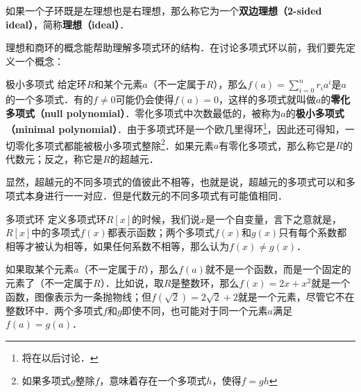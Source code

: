 如果一个子环既是左理想也是右理想，那么称它为一个\textbf{双边理想（2-sided ideal）}，简称\textbf{理想（ideal）}．

理想和商环的概念能帮助理解多项式环的结构．在讨论多项式环以前，我们要先定义一个概念：

\begin{definition}{极小多项式}
给定环$R$和某个元素$a$（不一定属于$R$），那么$f(a)=\sum\limits^{n}_{i=0}r_ia^i$是$a$的一个多项式．有的$f\not=0$可能仍会使得$f(a)=0$，这样的多项式就叫做$a$的\textbf{零化多项式（null polynomial）}．零化多项式中次数最低的，被称为$a$的\textbf{极小多项式（minimal polynomial）}．由于多项式环是一个欧几里得环\footnote{将在以后讨论．}，因此还可得知，一切零化多项式都能被极小多项式整除\footnote{如果多项式$g$整除$f$，意味着存在一个多项式$h$，使得$f=gh$}．如果元素$a$有零化多项式，那么称它是$R$的代数元；反之，称它是$R$的超越元．
\end{definition}

显然，超越元的不同多项式的值彼此不相等，也就是说，超越元的多项式可以和多项式本身进行一一对应．但是代数元的不同多项式有可能值相同．

\begin{example}{多项式环}
定义多项式环$R[x]$的时候，我们说$x$是一个自变量，言下之意就是，$R[x]$中的多项式$f(x)$都表示函数；两个多项式$f(x)$和$g(x)$只有每个系数都相等才被认为相等，如果任何系数不相等，那么认为$f(x)\not=g(x)$．

如果取某个元素$a$（不一定属于$R$），那么$f(a)$就不是一个函数，而是一个固定的元素了（不一定属于$R$）．比如说，取$R$是整数环，那么$f(x)=2x+x^2$就是一个函数，图像表示为一条抛物线；但$f(\sqrt{2})=2\sqrt{2}+2$就是一个元素，尽管它不在整数环中．两个多项式$f$和$g$即使不同，也可能对于同一个元素$a$满足$f(a)=g(a)$．


\end{example}
